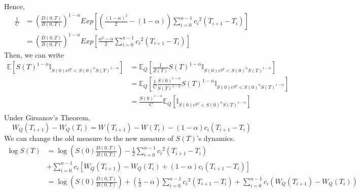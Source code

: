 Hence,
\begin{align*}
    \frac{1}{C}&= \left(\frac{D(0,T)}{B(0,T)}\right)^{1-\alpha}    Exp\left[\left(\frac{(1-\alpha)^2}{2}-(1-\alpha)\right)\sum_{i=0}^{n-1} {c_i}^2(T_{i+1}-T_{i})\right] \\
    &=\left(\frac{D(0,T)}{B(0,T)}\right)^{1-\alpha}    Exp\left[\frac{\alpha^2-\alpha}{2}\sum_{i=0}^{n-1} {c_i}^2(T_{i+1}-T_{i})\right] 
\end{align*}
Then, we can write
\begin{align*}
    \mathbb{E}[S(T)^{1-\alpha}\mathbb{I}_{S(0)e^{gT}<S(0)^\alpha S(T)^{1-\alpha}}]&=\mathbb{E}_Q[\frac{1}{Z(T)}S(T)^{1-\alpha}\mathbb{I}_{S(0)e^{gT}<S(0)^\alpha S(T)^{1-\alpha}}]\\
    &=\mathbb{E}_Q[\frac{1}{C}\frac{S(0)^{1-\alpha}}{ S(T)^{1-\alpha}}S(T)^{1-\alpha}\mathbb{I}_{S(0)e^{gT}<S(0)^\alpha S(T)^{1-\alpha}}]\\
    &=\frac{S(0)^{1-\alpha}}{C}\mathbb{E}_Q[\mathbb{I}_{S(0)e^{gT}<S(0)^\alpha S(T)^{1-\alpha}}]\\
\end{align*}
Under Girsanov's Theorem,
\[W_Q(T_{i+1})-W_Q(T_i)=W(T_{i+1})-W(T_i)-(1-\alpha) c_i (T_{i+1}-T_i)\]
We can change the old measure to the new measure of \(S(T)\)'s dynamics. 
\begin{align*}
\log S(T) &= \log \left( S(0)\frac{D(0,T)}{B(0,T)}\right)-\frac{1}{2}\sum_{i=0}^{n-1} {c_i}^2(T_{i+1}-T_{i})\\
&+\sum_{i=0}^{n-1} c_i  \left[W_Q(T_{i+1})-W_Q(T_i)+(1-\alpha) c_i (T_{i+1}-T_i) \right]\\
&=\log \left( S(0)\frac{D(0,T)}{B(0,T)}\right)+(\frac{1}{2}-\alpha)\sum_{i=0}^{n-1} {c_i}^2(T_{i+1}-T_{i})+\sum_{i=0}^{n-1} c_i  (W_Q(T_{i+1})-W_Q(T_i))
\end{align*}

